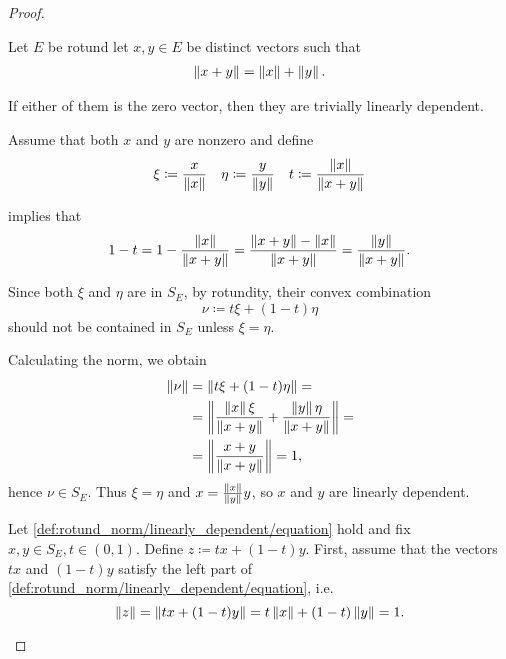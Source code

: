 \begin{proof}
\begin{description}
     Let \( E \) be rotund let \( x, y \in E \) be distinct vectors such that
    \begin{align}\label{def:rotund_norm/linearly_dependent/assumption}
      \left\Vert x + y \right\Vert = \left\Vert x \right\Vert + \left\Vert y \right\Vert.
    \end{align}

    If either of them is the zero vector, then they are trivially linearly dependent.

    Assume that both \( x \) and \( y \) are nonzero and define
    \begin{align*}
      \xi \coloneqq \frac x {\left\Vert x \right\Vert}
      &&
      \eta \coloneqq \frac y {\left\Vert y \right\Vert}
      &&
      t \coloneqq \frac {\left\Vert x \right\Vert} {\left\Vert x + y \right\Vert}
    \end{align*}

     implies that
    \begin{equation*}
      1 - t = 1 - \frac {\left\Vert x \right\Vert} {\left\Vert x + y \right\Vert} = \frac {\left\Vert x + y \right\Vert - \left\Vert x \right\Vert} {\left\Vert x + y \right\Vert} = \frac {\left\Vert y \right\Vert} {\left\Vert x+y \right\Vert}.
    \end{equation*}

    Since both \( \xi \) and \( \eta \) are in \( S_E \), by rotundity, their convex combination
    \begin{equation*}
      \nu \coloneqq t \xi + (1-t)\eta
    \end{equation*}
    should not be contained in \( S_E \) unless \( \xi = \eta \).

    Calculating the norm, we obtain
    \begin{align*}
      \left\Vert \nu \right\Vert
      &=
      \left\Vert t \xi + (1-t)\eta \right\Vert
      = \\ &=
      \left\Vert \frac {\left\Vert x \right\Vert \xi} {\left\Vert x + y \right\Vert} + \frac {\left\Vert y \right\Vert \eta} {\left\Vert x + y \right\Vert} \right\Vert
      = \\ &=
      \left\Vert \frac {x + y} {\left\Vert x + y \right\Vert} \right\Vert
      = 1,
    \end{align*}
    hence \( \nu \in S_E \). Thus \( \xi = \eta \) and \( x = \frac {\left\Vert x \right\Vert} {\left\Vert y \right\Vert} y \), so \( x \) and \( y \) are linearly dependent.

     Let \cref{def:rotund_norm/linearly_dependent/equation} hold and fix \( x, y \in S_E, t \in (0, 1) \). Define \( z \coloneqq tx + (1-t)y \).
    First, assume that the vectors \( tx \) and \( (1-t)y \) satisfy the left part of \cref{def:rotund_norm/linearly_dependent/equation}, i.e.
    \begin{equation*}
       \left\Vert z \right\Vert = \left\Vert tx + (1-t)y \right\Vert = t \left\Vert x \right\Vert + (1-t) \left\Vert y \right\Vert = 1.
    \end{equation*}


\end{description}
\end{proof}
